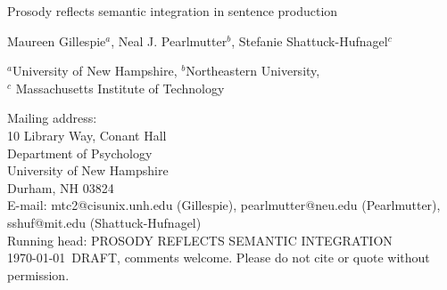 \documentclass[12pt,titlepage]{article}
\begin{document}

\begin{titlepage}
\thispagestyle{myheadings}  %
\begin{center}

\vspace*{\fill}  %

{\Large Prosody reflects semantic integration in sentence production}

\vfill

{\large Maureen Gillespie$^{a}$, Neal J. Pearlmutter$^{b}$, Stefanie Shattuck-Hufnagel$^{c}$

$^{a}$University of New Hampshire, $^{b}$Northeastern University,\\ $^{c}$ Massachusetts Institute of Technology

\vfill

}
\end{center}

\vfill

\begin{flushleft}

Mailing address: \\
10 Library Way, Conant Hall\\
Department of Psychology\\
University of New Hampshire\\
Durham, NH 03824 \\[\baselineskip]

E-mail: mtc2@cisunix.unh.edu (Gillespie), pearlmutter@neu.edu (Pearlmutter), sshuf@mit.edu (Shattuck-Hufnagel) \\[\baselineskip]

Running head: PROSODY REFLECTS SEMANTIC INTEGRATION
\\[\baselineskip]

\today\ DRAFT, comments welcome.
Please do not cite or quote without permission.
\end{flushleft}

\end{titlepage}
\end{document}
